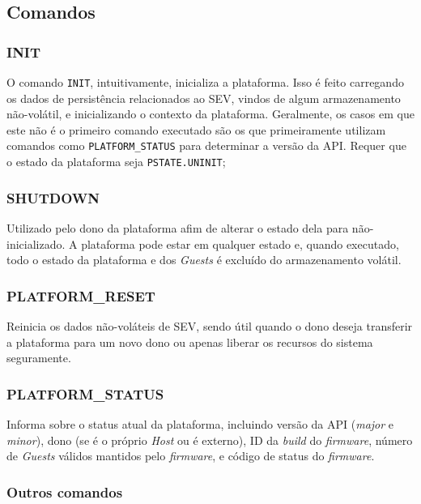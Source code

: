 \documentclass{report}
\begin{document}
\subsection{Comandos}

\subsubsection{INIT}

O comando \texttt{INIT}, intuitivamente, inicializa a plataforma. Isso é feito
carregando os dados de persistência relacionados ao SEV, vindos de algum
armazenamento não-volátil, e inicializando o contexto da plataforma.
Geralmente, os casos em que este não é o primeiro comando executado são os que
primeiramente utilizam comandos como \texttt{PLATFORM\_STATUS} para determinar
a versão da API\@. Requer que o estado da plataforma seja
\texttt{PSTATE.UNINIT};

\subsubsection{SHUTDOWN}

Utilizado pelo dono da plataforma afim de alterar o estado dela para
não-inicializado. A plataforma pode estar em qualquer estado e, quando
executado, todo o estado da plataforma e dos \textit{Guests} é excluído do
armazenamento volátil.

\subsubsection{PLATFORM\_RESET}

Reinicia os dados não-voláteis de SEV, sendo útil quando o dono deseja
transferir a plataforma para um novo dono ou apenas liberar os recursos do
sistema seguramente.

\subsubsection{PLATFORM\_STATUS}

Informa sobre o status atual da plataforma, incluindo versão da API
(\textit{major} e \textit{minor}), dono (se é o próprio \textit{Host} ou é
externo), ID da \textit{build} do \textit{firmware}, número de \textit{Guests}
válidos mantidos pelo \textit{firmware}, e código de status do
\textit{firmware}.

\subsubsection{Outros comandos}
\end{document}
